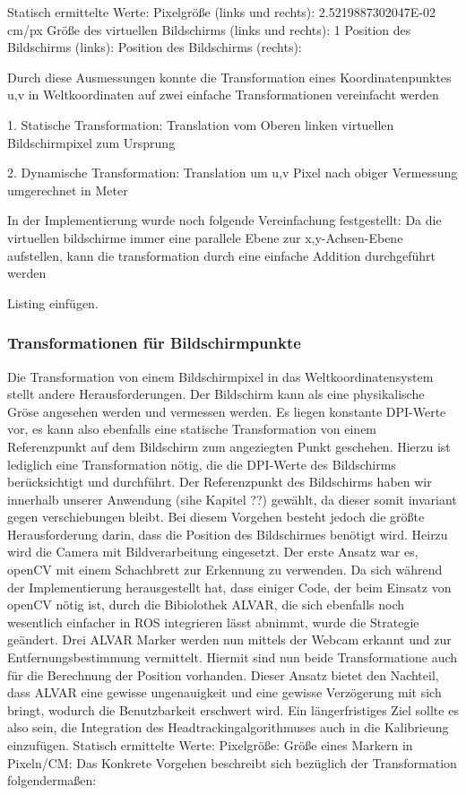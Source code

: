 {    Statisch ermittelte Werte:
    Pixelgröße (links und rechts):      2.5219887302047E-02 cm/px 
    Größe des virtuellen Bildschirms (links und rechts):      1
    Position des Bildschirms (links):
    Position des Bildschirms (rechts):
        
Durch diese Ausmessungen konnte die  Transformation eines Koordinatenpunktes u,v in Weltkoordinaten auf zwei einfache Transformationen vereinfacht werden

    1. Statische Transformation: Translation vom Oberen linken virtuellen Bildschirmpixel zum Ursprung

    2. Dynamische Transformation: Translation um u,v Pixel nach obiger Vermessung umgerechnet in Meter

In der Implementierung wurde noch folgende Vereinfachung festgestellt: Da die virtuellen bildschirme immer eine parallele Ebene zur x,y-Achsen-Ebene aufstellen, kann die transformation durch eine einfache Addition durchgeführt werden

    Listing einfügen.

\subsubsection{Transformationen für Bildschirmpunkte}
Die Transformation von einem Bildschirmpixel in das Weltkoordinatensystem stellt andere Herausforderungen. Der Bildschirm kann als eine physikalische Gröse angesehen werden und vermessen werden. Es liegen konstante DPI-Werte vor, es kann also ebenfalls eine statische Transformation von einem Referenzpunkt auf dem Bildschirm zum angeziegten Punkt geschehen. Hierzu ist lediglich eine Transformation nötig, die die DPI-Werte des Bildschirms berücksichtigt und durchführt. Der Referenzpunkt des Bildschirms haben wir innerhalb unserer Anwendung (sihe Kapitel ??) gewählt, da dieser somit invariant gegen verschiebungen bleibt. Bei diesem Vorgehen besteht jedoch die größte Herausforderung darin, dass die Position des Bildschirmes benötigt wird. Heirzu wird die Camera mit Bildverarbeitung eingesetzt. Der erste Ansatz war es, openCV mit einem Schachbrett zur Erkennung zu verwenden. Da sich während der Implementierung herausgestellt hat, dass einiger Code, der beim Einsatz von openCV nötig ist, durch die Bibiolothek ALVAR, die sich ebenfalls noch wesentlich einfacher in ROS integrieren lässt abnimmt, wurde die Strategie geändert. Drei ALVAR Marker werden nun mittels der Webcam erkannt und zur Entfernungsbestimmung vermittelt. Hiermit sind nun beide Transformatione auch für die Berechnung der Position vorhanden. Dieser Ansatz bietet den Nachteil, dass ALVAR eine gewisse ungenauigkeit und eine gewisse Verzögerung mit sich bringt, wodurch die Benutzbarkeit erschwert wird. Ein längerfristiges Ziel sollte es also sein, die Integration des Headtrackingalgorithmuses auch in die Kalibrieung einzufügen.
    Statisch ermittelte Werte:
    Pixelgröße:
    Größe eines Markern in Pixeln/CM:
Das Konkrete Vorgehen beschreibt sich bezüglich der Transformation folgendermaßen:

}
